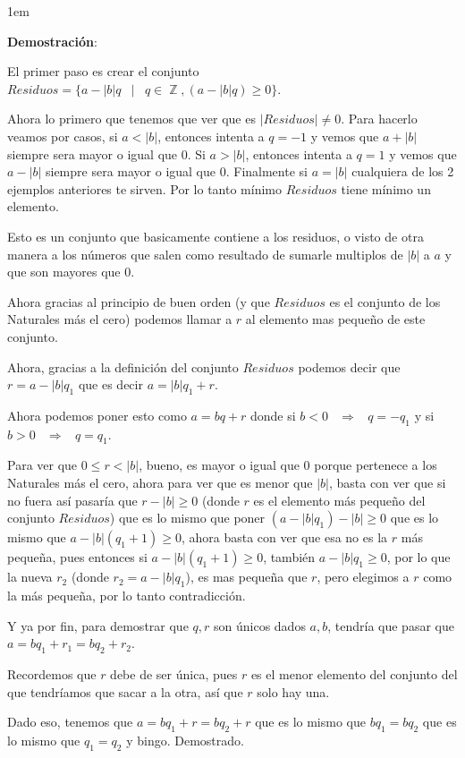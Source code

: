\documentclass[12pt]{report}                                    %
\newenvironment{SmallIndentation}[1][0.75em]                    %
    {\begin{adjustwidth}{#1}{}\begin{footnotesize}}                 %
    {\end{footnotesize}\end{adjustwidth}}                           %
\DeclareMathOperator \Space {\quad}                             %
\DeclareMathOperator \MiniSpace {\;}                            %
\newcommand \Such {\MiniSpace|\MiniSpace}                       %
\newcommand \lequal {\MiniSpace \Leftrightarrow \MiniSpace}     %
\newcommand \linfire {\MiniSpace \Rightarrow \MiniSpace}        %
\DeclareMathOperator \Integers  {\mathbb{Z}}                     %
\begin{document}
            \begin{SmallIndentation}[1em]
                \textbf{Demostración}:

                El primer paso es crear el conjunto
                $Residuos = \{a-|b|q \Such q \in \Integers, (a-|b|q) \geq 0 \}$.

                Ahora lo primero que tenemos que ver que es $|Residuos| \neq 0$. Para hacerlo
                veamos por casos, si $a < |b|$, entonces intenta a $q=-1$ y vemos que $a+|b|$
                siempre sera mayor o igual que $0$.
                Si $a > |b|$, entonces intenta a $q=1$ y vemos que $a-|b|$ siempre sera mayor
                o igual que $0$.
                Finalmente si $a = |b|$ cualquiera de los 2 ejemplos anteriores te sirven.
                Por lo tanto mínimo $Residuos$ tiene mínimo un elemento.

                Esto es un conjunto que basicamente contiene a los residuos, o visto de otra
                manera a los números que salen como resultado de sumarle multiplos de $|b|$ a $a$
                y que son mayores que 0.

                Ahora gracias al principio de buen orden (y que $Residuos$ es el conjunto
                de los Naturales más el cero) podemos llamar a $r$ al elemento mas pequeño
                de este conjunto.

                Ahora, gracias a la definición del conjunto $Residuos$ podemos decir que
                $r=a-|b|q_1$ que es decir $a=|b|q_1+r$.

                Ahora podemos poner esto como $a=bq+r$ donde si $b<0 \linfire q = -q_1$ y si
                $b>0 \linfire q=q_1$.

                Para ver que $0 \leq r < |b|$, bueno, es mayor o igual que $0$ porque pertenece a los
                Naturales más el cero, ahora para ver que es menor que $|b|$, basta con ver que si no
                fuera así  pasaría que $r-|b| \geq 0$ (donde $r$ es el elemento más pequeño del conjunto
                $Residuos$) que es lo mismo que poner $(a-|b|q_1)-|b| \geq 0$ que es lo mismo que
                $a-|b|(q_1+1)\geq 0$, ahora basta con ver que esa no es la $r$ más pequeña,
                pues entonces si $a-|b|(q_1+1)\geq 0$, también $a-|b|q_1\geq 0$, por lo que la nueva $r_2$
                (donde $r_2 = a-|b|q_1$), es mas pequeña que $r$, pero elegimos a $r$ como la más pequeña,
                por lo tanto contradicción.

                Y ya por fin, para demostrar que $q, r$ son únicos dados $a, b$, tendría que pasar
                que $a=bq_1+r_1=bq_2+r_2$.

                Recordemos que $r$ debe de ser única, pues $r$ es el menor elemento del conjunto
                del que tendríamos que sacar a la otra, así que $r$ solo hay una.

                Dado eso, tenemos que $a=bq_1+r=bq_2+r$ que es lo mismo que $bq_1=bq_2$
                que es lo mismo que $q_1=q_2$ y bingo. Demostrado.

            \end{SmallIndentation}
\end{document}
